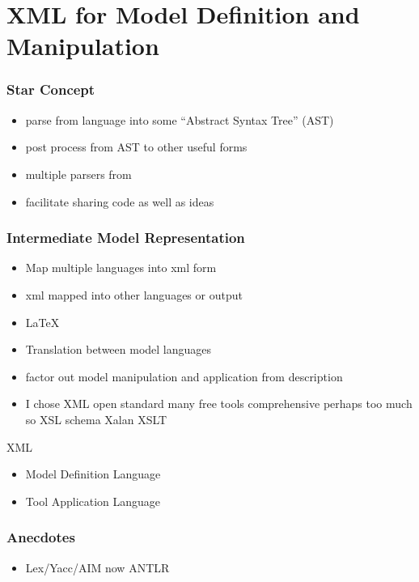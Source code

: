 \documentclass{beamer}
\begin{document}
\section{XML for  Model Definition and Manipulation}

\begin{frame}
  \frametitle{Star Concept}

  \begin{itemize}
  \item parse from language into some ``Abstract Syntax Tree'' (AST)
  \item post process from AST to other useful forms
  \item multiple parsers from
  \item facilitate sharing code as well as ideas
  \end{itemize}

\end{frame}

  \begin{frame}
    \frametitle{Intermediate Model Representation}
    \begin{itemize}
    \item Map multiple languages into xml form
    \item xml mapped into other languages or output
    \item \LaTeX
\item  Translation between model languages
\item factor out model manipulation and application from description
\item I chose XML open standard many free tools comprehensive perhaps too much so  XSL schema Xalan XSLT
    \end{itemize}
  \end{frame}


\begin{frame}{XML }

  \begin{itemize}
  \item Model Definition Language
  \item Tool Application Language
  \end{itemize}

  
\end{frame}


\begin{frame}
  \frametitle{Anecdotes}
  \begin{itemize}
  \item Lex/Yacc/AIM  now  ANTLR
  \end{itemize}
\end{frame}
\end{document}
